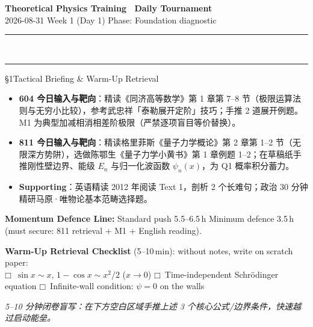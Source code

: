 \documentclass[a4paper,11pt]{article}
\newcommand{\checkbox}{\ensuremath{\mdlgwhtsquare}}
\begin{document}
\begin{center}
  {\LARGE\bfseries\color{navy} Theoretical Physics Training \textperiodcentered\ Daily Tournament}\\[4pt]
  {\small\sffamily\color{mist} 2026-08-31 \quad\textbar\quad Week 1 (Day 1) \quad\textbar\quad Phase: Foundation diagnostic}\\[-3pt]
  {\color{navy}\rule{\textwidth}{0.8pt}}\\[-11pt]
  {\color{border}\rule{\textwidth}{0.3pt}}
\end{center}

\vspace{-4pt}

\begin{briefing}{\S 1\quad Tactical Briefing \& Warm-Up Retrieval}
\begin{itemize}[leftmargin=1.5em, itemsep=2pt, topsep=2pt]
  \item \textbf{604 今日输入与靶向}：精读《同济高等数学》第 1 章第 7--8 节（极限运算法则与无穷小比较），参考武忠祥「泰勒展开定阶」技巧；手推 2 道展开例题。M1 为典型加减相消相差阶极限（严禁逐项盲目等价替换）。
  \item \textbf{811 今日输入与靶向}：精读格里菲斯《量子力学概论》第 2 章第 1--2 节（无限深方势阱），选做陈鄂生《量子力学小黄书》第 1 章例题 1--2；在草稿纸手推刚性壁边界、能级 $E_n$ 与归一化波函数 $\psi_n(x)$，为 Q1 概率积分蓄力。
  \item \textbf{Supporting}：英语精读 2012 年阅读 Text 1，剖析 2 个长难句；政治 30 分钟精研马原·唯物论基本范畴选择题。
\end{itemize}

\begin{notebox}
\textbf{Momentum Defence Line:} Standard push 5.5--6.5\,h \quad\textbar\quad Minimum defence 3.5\,h (must secure: 811 retrieval + M1 + English reading).
\end{notebox}

\vspace{1mm}
\textbf{Warm-Up Retrieval Checklist} (5--10\,min): without notes, write on scratch paper:\\
\checkbox\ $\sin x\sim x$, $1-\cos x\sim x^2/2$ ($x\to 0$) \quad
\checkbox\ Time-independent Schrödinger equation \quad
\checkbox\ Infinite-wall condition: $\psi=0$ on the walls
\end{briefing}

\vspace{6pt}

\begin{tcolorbox}[
  enhanced, colback=white, colframe=border, boxrule=0.6pt, arc=2mm,
  left=4mm, right=4mm, top=3mm, bottom=3mm,
  fonttitle=\sffamily\bfseries\color{slate},
  title={\raisebox{0pt}{\color{royal}\rule{3pt}{10pt}}\hspace{4pt}Warm-Up Retrieval Workspace \textbar\ 白纸破冰草稿区},
  colbacktitle=paper, coltitle=slate,
  titlerule=0pt, toptitle=2mm, bottomtitle=2mm
]
\textcolor{mist}{\footnotesize\itshape 5--10 分钟闭卷盲写：在下方空白区域手推上述 3 个核心公式/边界条件，快速越过启动能垒。}
\vspace{9.2cm}
\end{tcolorbox}
\end{document}
